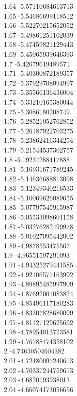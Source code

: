 {1.64	-5.57110684613713\\
1.65	-5.54686699118512\\
1.66	-5.52270215652052\\
1.67	-5.49861251162039\\
1.68	-5.47459821129443\\
1.69	-5.45065939646393\\
1.7	-5.42679619489571\\
1.71	-5.40300872189357\\
1.72	-5.37929708094997\\
1.73	-5.35566136436004\\
1.74	-5.33210165380044\\
1.75	-5.3086180208749\\
1.76	-5.28521052762852\\
1.77	-5.26187922703275\\
1.78	-5.23862416344254\\
1.79	-5.21544537302757\\
1.8	-5.19234288417888\\
1.81	-5.16931671789245\\
1.82	-5.14636688813098\\
1.83	-5.12349340216533\\
1.84	-5.10069626089655\\
1.85	-5.07797545915987\\
1.86	-5.05533098601158\\
1.87	-5.03276282499978\\
1.88	-5.01027095442002\\
1.89	-4.9878553475567\\
1.9	-4.96551597291093\\
1.91	-4.94325279441585\\
1.92	-4.92106577163992\\
1.93	-4.89895485997909\\
1.94	-4.87692001083824\\
1.95	-4.85496117180283\\
1.96	-4.83307828680099\\
1.97	-4.81127129625692\\
1.98	-4.78954013723581\\
1.99	-4.76788474358102\\
2	-4.74630504604382\\
2.01	-4.72480097240613\\
2.02	-4.70337244759673\\
2.03	-4.6820193938013\\
2.04	-4.66074173056656\\
}
